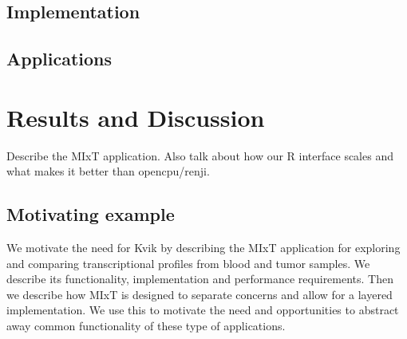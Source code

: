 \subsection*{Implementation}

\subsection*{Applications}




\section*{Results and Discussion}
Describe the MIxT application. Also talk about how our R interface scales and
what makes it better than opencpu/renji.


\subsection*{Motivating example}



We motivate the need for Kvik by describing the MIxT application for exploring
and comparing transcriptional profiles from blood and tumor samples. We
describe its functionality, implementation 
and performance requirements.
Then we describe how MIxT
is designed to separate concerns and allow for a layered implementation. We use
this to motivate the need and opportunities to abstract away common
functionality of these type of applications.

